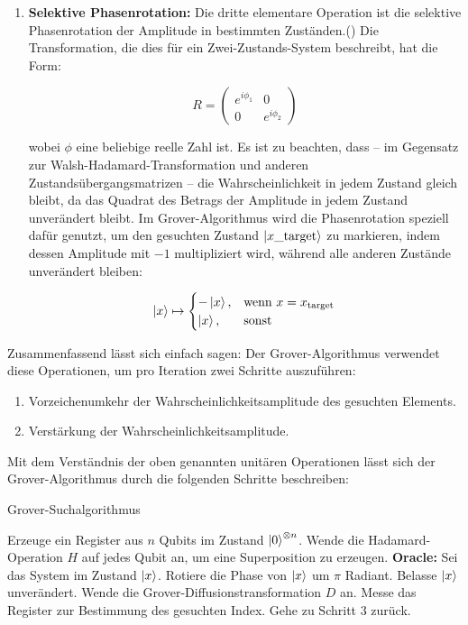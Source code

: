 \begin{enumerate}
    \item \textbf{Selektive Phasenrotation:} Die dritte elementare Operation ist die selektive Phasenrotation der Amplitude in bestimmten Zuständen.(\cite{zotero-1211}) Die Transformation, die dies für ein Zwei-Zustands-System beschreibt, hat die Form:

    $$
R = \begin{pmatrix}
e^{i\phi_1} & 0 \\
0 & e^{i\phi_2}
\end{pmatrix}
$$

wobei \( \phi \) eine beliebige reelle Zahl ist. Es ist zu beachten, dass – im Gegensatz zur Walsh-Hadamard-Transformation und anderen Zustandsübergangsmatrizen – die Wahrscheinlichkeit in jedem Zustand gleich bleibt, da das Quadrat des Betrags der Amplitude in jedem Zustand unverändert bleibt.
Im Grover-Algorithmus wird die Phasenrotation speziell dafür genutzt, um den gesuchten Zustand $\ket{x\_{\text{target}}}$ zu markieren, indem dessen Amplitude mit $-1$ multipliziert wird, während alle anderen Zustände unverändert bleiben:

$$
\ket{x} \mapsto 
\begin{cases}
- \ket{x}, & \text{wenn } x = x_{\text{target}} \\
\ket{x}, & \text{sonst}
\end{cases}
$$

\end{enumerate}

Zusammenfassend lässt sich einfach sagen: Der Grover-Algorithmus verwendet diese Operationen, um pro Iteration zwei Schritte auszuführen:
\begin{enumerate}
  \item Vorzeichenumkehr der Wahrscheinlichkeitsamplitude des gesuchten Elements.
  \item Verstärkung der Wahrscheinlichkeitsamplitude.
\end{enumerate}

Mit dem Verständnis der oben genannten unitären Operationen lässt sich der Grover-Algorithmus durch die folgenden Schritte beschreiben:

\begin{algorithm}[H]
\label{alg:grover}
\caption{Grover-Suchalgorithmus}
\begin{algorithmic}[1]
\State Erzeuge ein Register aus \( n \) Qubits im Zustand \( \ket{0}^{\otimes n} \).
\State Wende die Hadamard-Operation \( H \) auf jedes Qubit an, um eine Superposition zu erzeugen.
\Repeat
  \State\textbf{Oracle:}
  \Statex \hspace{1em} Sei das System im Zustand \( \ket{x} \).
    \State Rotiere die Phase von \( \ket{x} \) um \( \pi \) Radiant.
  \Else
    \State Belasse \( \ket{x} \) unverändert.
  \EndIf
  \State Wende die Grover-Diffusionstransformation $D$ an.
  \State Messe das Register zur Bestimmung des gesuchten Index.
  \State Gehe zu Schritt 3 zurück.
\EndIf
{}
\end{algorithmic}
\end{algorithm}

